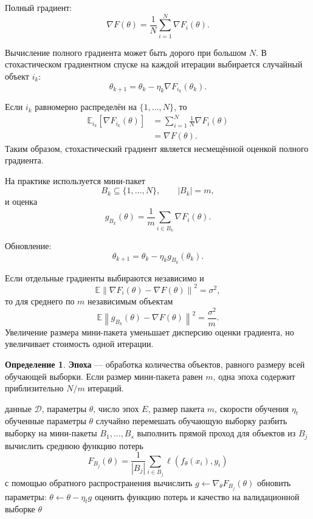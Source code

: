 \documentclass[12pt,a4paper]{article}
\theoremstyle{plain}
\theoremstyle{definition}
\newtheorem{definition}{Определение}[section]
\theoremstyle{remark}
\newcommand{\E}{\mathbb{E}}
\newcommand{\norm}[1]{\left\lVert #1 \right\rVert}
\newcommand{\abs}[1]{\left| #1 \right|}
\begin{document}
Полный градиент:
\[
    \nabla F(\theta)
    =
    \frac{1}{N}
    \sum_{i=1}^{N}\nabla F_i(\theta).
\]

Вычисление полного градиента может быть дорого при большом $N$.
В стохастическом градиентном спуске на каждой итерации выбирается
случайный объект $i_k$:
\[
    \theta_{k+1}
    =
    \theta_k
    -
    \eta_k\nabla F_{i_k}(\theta_k).
\]

Если $i_k$ равномерно распределён на
$\{1,\ldots,N\}$, то
\[
\begin{aligned}
    \E_{i_k}
    \left[
        \nabla F_{i_k}(\theta)
    \right]
    &=
    \sum_{i=1}^{N}
    \frac{1}{N}\nabla F_i(\theta)\\
    &=
    \nabla F(\theta).
\end{aligned}
\]
Таким образом, стохастический градиент является несмещённой оценкой
полного градиента.

На практике используется мини-пакет
\[
    B_k\subseteq\{1,\ldots,N\},
    \qquad
    \abs{B_k}=m,
\]
и оценка
\[
    g_{B_k}(\theta)
    =
    \frac{1}{m}
    \sum_{i\in B_k}
    \nabla F_i(\theta).
\]

Обновление:
\[
    \theta_{k+1}
    =
    \theta_k-\eta_k g_{B_k}(\theta_k).
\]

Если отдельные градиенты выбираются независимо и
\[
    \E\norm{\nabla F_i(\theta)-\nabla F(\theta)}^2
    =
    \sigma^2,
\]
то для среднего по $m$ независимым объектам
\[
    \E\norm{
        g_{B_k}(\theta)-\nabla F(\theta)
    }^2
    =
    \frac{\sigma^2}{m}.
\]
Увеличение размера мини-пакета уменьшает дисперсию оценки градиента,
но увеличивает стоимость одной итерации.

\begin{definition}
\textbf{Эпоха} --- обработка количества объектов, равного размеру
всей обучающей выборки. Если размер мини-пакета равен $m$, одна эпоха
содержит приблизительно $N/m$ итераций.
\end{definition}

\begin{algorithm}[H]
\caption{Обучение мини-пакетным градиентным спуском}
\begin{algorithmic}[1]
\Require данные $\mathcal{D}$, параметры $\theta$, число эпох $E$,
размер пакета $m$, скорости обучения $\eta_t$
\Ensure обученные параметры $\theta$
    \State случайно перемешать обучающую выборку
    \State разбить выборку на мини-пакеты $B_1,\ldots,B_s$
        \State выполнить прямой проход для объектов из $B_j$
        \State вычислить среднюю функцию потерь
        \[
            F_{B_j}(\theta)
            =
            \frac{1}{\abs{B_j}}
            \sum_{i\in B_j}
            \ell(f_\theta(x_i),y_i)
        \]
        \State с помощью обратного распространения вычислить
        $g\gets\nabla_\theta F_{B_j}(\theta)$
        \State обновить параметры:
        $\theta\gets\theta-\eta_t g$
    \EndFor
    \State оценить функцию потерь и качество на валидационной выборке
\EndFor
\State \Return $\theta$
\end{algorithmic}
\end{algorithm}
\end{document}
